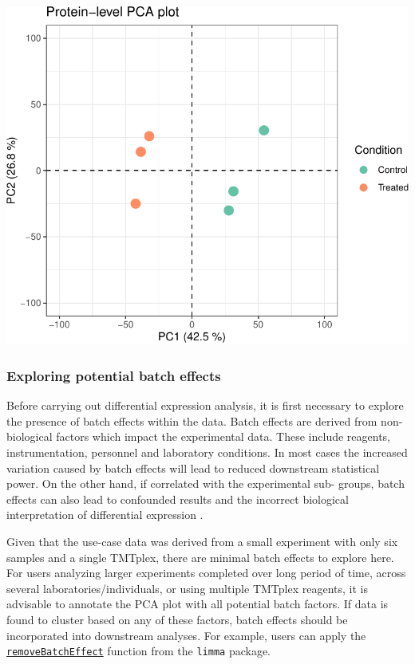 \documentclass[9pt,a4paper,]{extarticle}
\begin{document}
\begin{center}\includegraphics[height=0.4\textheight]{workflow_expressions_files/figure-latex/protein_pca_plot-1} \end{center}

\hypertarget{exploring-potential-batch-effects}{%
\subsubsection{Exploring potential batch effects}\label{exploring-potential-batch-effects}}

Before carrying out differential expression analysis, it is first necessary to
explore the presence of batch effects within the data. Batch effects are derived
from non-biological factors which impact the experimental data. These include
reagents, instrumentation, personnel and laboratory conditions. In most cases
the increased variation caused by batch effects will lead to reduced downstream
statistical power. On the other hand, if correlated with the experimental sub-
groups, batch effects can also lead to confounded results and the incorrect
biological interpretation of differential expression \citep{Leek2010}.

Given that the use-case data was derived from a small experiment with only six
samples and a single TMTplex, there are minimal batch effects to explore here.
For users analyzing larger experiments completed over long period of time, across
several laboratories/individuals, or using multiple TMTplex reagents, it is
advisable to annotate the PCA plot with all potential batch factors. If data is
found to cluster based on any of these factors, batch effects should be
incorporated into downstream analyses. For example, users can apply the
\href{https://rdrr.io/bioc/limma/man/removeBatchEffect.html}{\texttt{removeBatchEffect}}
function from the \texttt{limma} package.
\end{document}
